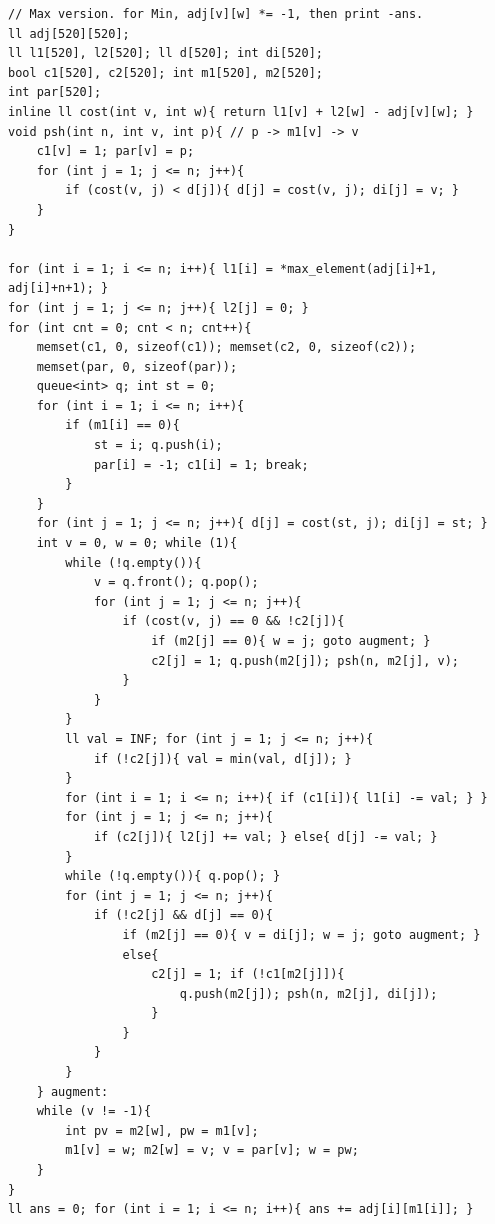 \begin{verbatim}
// Max version. for Min, adj[v][w] *= -1, then print -ans.
ll adj[520][520];
ll l1[520], l2[520]; ll d[520]; int di[520];
bool c1[520], c2[520]; int m1[520], m2[520];
int par[520];
inline ll cost(int v, int w){ return l1[v] + l2[w] - adj[v][w]; }
void psh(int n, int v, int p){ // p -> m1[v] -> v
	c1[v] = 1; par[v] = p;
	for (int j = 1; j <= n; j++){
		if (cost(v, j) < d[j]){ d[j] = cost(v, j); di[j] = v; }
	}
}

for (int i = 1; i <= n; i++){ l1[i] = *max_element(adj[i]+1, adj[i]+n+1); }
for (int j = 1; j <= n; j++){ l2[j] = 0; }
for (int cnt = 0; cnt < n; cnt++){
	memset(c1, 0, sizeof(c1)); memset(c2, 0, sizeof(c2));
	memset(par, 0, sizeof(par));
	queue<int> q; int st = 0;
	for (int i = 1; i <= n; i++){
		if (m1[i] == 0){
			st = i; q.push(i);
			par[i] = -1; c1[i] = 1; break;
		}
	}
	for (int j = 1; j <= n; j++){ d[j] = cost(st, j); di[j] = st; }
	int v = 0, w = 0; while (1){
		while (!q.empty()){
			v = q.front(); q.pop();
			for (int j = 1; j <= n; j++){
				if (cost(v, j) == 0 && !c2[j]){
					if (m2[j] == 0){ w = j; goto augment; }
					c2[j] = 1; q.push(m2[j]); psh(n, m2[j], v);
				}
			}
		}
		ll val = INF; for (int j = 1; j <= n; j++){
			if (!c2[j]){ val = min(val, d[j]); }
		}
		for (int i = 1; i <= n; i++){ if (c1[i]){ l1[i] -= val; } }
		for (int j = 1; j <= n; j++){
			if (c2[j]){ l2[j] += val; } else{ d[j] -= val; }
		}
		while (!q.empty()){ q.pop(); }
		for (int j = 1; j <= n; j++){
			if (!c2[j] && d[j] == 0){
				if (m2[j] == 0){ v = di[j]; w = j; goto augment; }
				else{
					c2[j] = 1; if (!c1[m2[j]]){
						q.push(m2[j]); psh(n, m2[j], di[j]);
					}
				}
			}
		}
	} augment:
	while (v != -1){
		int pv = m2[w], pw = m1[v];
		m1[v] = w; m2[w] = v; v = par[v]; w = pw;
	}
}
ll ans = 0; for (int i = 1; i <= n; i++){ ans += adj[i][m1[i]]; }
\end{verbatim}
